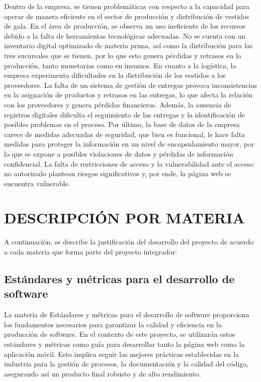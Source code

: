 \documentclass[conference]{IEEEtran}
\begin{document}
Dentro de la empresa, se tienen problemáticas con respecto a la capacidad para operar de manera eficiente en el sector de producción y distribución de vestidos de gala. En el área de producción, se observa un uso ineficiente de los recursos debido a la falta de herramientas tecnológicas adecuadas. No se cuenta con un inventario digital optimizado de materia prima, así como la distribución para las tres sucursales que se tienen, por lo que esto genera pérdidas y retrasos en la producción, tanto monetarias como en insumos. En cuanto a la logística, la empresa experimenta dificultades en la distribución de los vestidos a los proveedores. La falta de un sistema de gestión de entregas provoca inconsistencias en la asignación de productos y retrasos en las entregas, lo que afecta la relación con los proveedores y genera pérdidas financieras. Además, la ausencia de registros digitales dificulta el seguimiento de las entregas y la identificación de posibles problemas en el proceso. Por último, la base de datos de la empresa carece de medidas adecuadas de seguridad, que bien es funcional, le hace falta medidas para proteger la información en un nivel de encapsulamiento mayor, por lo que se expone a posibles violaciones de datos y pérdidas de información confidencial. La falta de restricciones de acceso y la vulnerabilidad ante el acceso no autorizado plantean riesgos significativos y, por ende, la página web se encuentra vulnerable.

\section{DESCRIPCIÓN POR MATERIA}

A continuación, se describe la justificación del desarrollo del proyecto de acuerdo a cada materia que forma parte del proyecto integrador:

\subsection{Estándares y métricas para el desarrollo de software}

La materia de Estándares y métricas para el desarrollo de software proporciona los fundamentos necesarios para garantizar la calidad y eficiencia en la producción de software. En el contexto de este proyecto, se utilizarán estos estándares y métricas como guía para desarrollar tanto la página web como la aplicación móvil. Esto implica seguir las mejores prácticas establecidas en la industria para la gestión de procesos, la documentación y la calidad del código, asegurando así un producto final robusto y de alto rendimiento.
\end{document}
